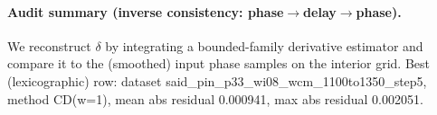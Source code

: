 \paragraph{Audit summary (inverse consistency: phase$\to$delay$\to$phase).} \AuditTag We reconstruct $\delta$ by integrating a bounded-family derivative estimator and compare it to the (smoothed) input phase samples on the interior grid. Best (lexicographic) row: dataset said\_pin\_p33\_wi08\_wcm\_1100to1350\_step5, method CD(w=1), mean abs residual 0.000941, max abs residual 0.002051.